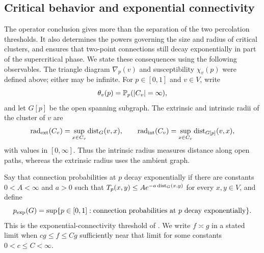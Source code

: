 \subsection{Critical behavior and exponential connectivity}

The operator conclusion gives more than the separation of the two
percolation thresholds. It also determines the powers governing the
size and radius of critical clusters, and ensures that two-point
connections still decay exponentially in part of the supercritical
phase. We state these consequences using the following observables.
The triangle diagram $\nabla_p(v)$ and susceptibility $\chi_v(p)$
were defined above; either may be infinite. For $p\in[0,1]$ and
$v\in V$, write
\[
 \theta_v(p)=\mathbb P_p(|C_v|=\infty),
\]
and let $G[p]$ be the open spanning subgraph.
The extrinsic and intrinsic radii of the cluster of $v$ are
\[
 \operatorname{rad}_{\mathrm{ext}}(C_v)
    =\sup_{x\in C_v}\operatorname{dist}_G(v,x),\qquad
 \operatorname{rad}_{\mathrm{int}}(C_v)
    =\sup_{x\in C_v}\operatorname{dist}_{G[p]}(v,x),
\]
with values in $[0,\infty]$. Thus the intrinsic radius measures
distance along open paths, whereas the extrinsic radius uses the
ambient graph.

Say that connection probabilities at $p$ decay exponentially if
there are constants $0<A<\infty$ and $a>0$ such that
$T_p(x,y)\le A e^{-a\operatorname{dist}_G(x,y)}$ for every $x,y\in V$, and define
\[
 {p_{\exp}}(G)=\sup\{p\in[0,1]:
       \text{connection probabilities at $p$ decay exponentially}\}.
\]
This is the exponential-connectivity threshold of
\cite[Section~2]{Hutchcroft2020L2}. We write $f\asymp g$ in a stated
limit when $c g\le f\le Cg$ sufficiently near that limit for some
constants $0<c\le C<\infty$.

